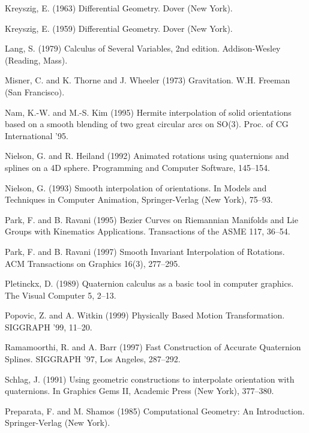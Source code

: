 \documentclass[12pt]{article}
\begin{document}
\begin{thebibliography}{99}
Kreyszig, E. (1963)
Differential Geometry.
Dover (New York).

Kreyszig, E. (1959) Differential Geometry.
Dover (New York).

Lang, S. (1979)
Calculus of Several Variables, 2nd edition.
Addison-Wesley (Reading, Mass).

Misner, C. and K. Thorne and J. Wheeler (1973)
Gravitation.
W.H. Freeman (San Francisco).

Nam, K.-W. and M.-S. Kim (1995)
Hermite interpolation of solid orientations based on a smooth blending
of two great circular arcs on SO(3).
Proc. of CG International '95.

Nielson, G. and R. Heiland (1992)
Animated rotations using quaternions and splines on a 4D sphere.
Programming and Computer Software, 145--154.

Nielson, G. (1993)
Smooth interpolation of orientations.
In Models and Techniques in Computer Animation, Springer-Verlag (New York),
75--93.

Park, F. and B. Ravani (1995)
Bezier Curves on Riemannian Manifolds and Lie Groups with
Kinematics Applications.
Transactions of the ASME 117, 36--54.

Park, F. and B. Ravani (1997)
Smooth Invariant Interpolation of Rotations.
ACM Transactions on Graphics 16(3), 277--295.

Pletinckx, D. (1989) 
Quaternion calculus as a basic tool in computer graphics.
The Visual Computer 5, 2--13.

Popovic, Z. and A. Witkin (1999)
Physically Based Motion Transformation.
SIGGRAPH '99, 11--20.

Ramamoorthi, R. and A. Barr (1997)
Fast Construction of Accurate Quaternion Splines.
SIGGRAPH '97, Los Angeles, 287--292.

Schlag, J. (1991) Using geometric constructions to interpolate
orientation with quaternions.  In Graphics Gems II, Academic Press (New York),
377--380.

Preparata, F. and M. Shamos (1985)
Computational Geometry: An Introduction.
Springer-Verlag (New York).


\end{thebibliography}
\end{document}
